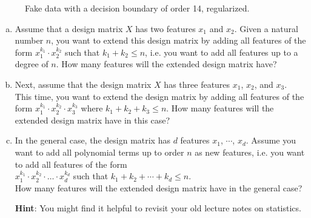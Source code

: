 \begin{figure}[!th]
\caption{Fake data with a decision boundary of order 14, regularized.}
\label{fig:fake-data-14-reg.pdf}
\end{figure}
\pagebreak

\exercise
\begin{enumerate}[(a)]
\item Assume that a design matrix $X$ has two features $x_1$ and $x_2$.  Given a natural number $n$, you want to
      extend this design matrix by adding all features of the form $x_1^{k_1} \cdot x_2^{k_2}$ such that
      $k_1 + k_2 \leq n$, i.e. you want to add all features up to a degree of $n$.
      How many features will the extended design matrix have?
\item Next, assume that the design matrix $X$ has three features $x_1$, $x_2$, and $x_3$.
      This time, you want to extend the design matrix by adding all features of the form
      $x_1^{k_1} \cdot x_2^{k_2} \cdot x_3^{k_3}$ where $k_1 + k_2 + k_3 \leq n$.
      How many features will the extended design matrix have in this case?
\item In the general case, the design matrix has $d$ features $x_1$, $\cdots$, $x_d$.  Assume you want to add all
     polynomial terms up to order $n$ as new features, i.e. you want to add all features of the form
     \\[0.2cm]
     \hspace*{1.3cm}
     $x_1^{k_1} \cdot x_2^{k_2} \cdot {\dots} \cdot x_d^{k_d}$ \quad such that $k_1 + k_2 + \cdots + k_d \leq n$.
     \\[0.2cm]
     How many features will the extended design matrix have in the general case?

     \textbf{Hint}:  You might find it helpful to revisit your old lecture notes on statistics.
     \eox
\end{enumerate}
\pagebreak


